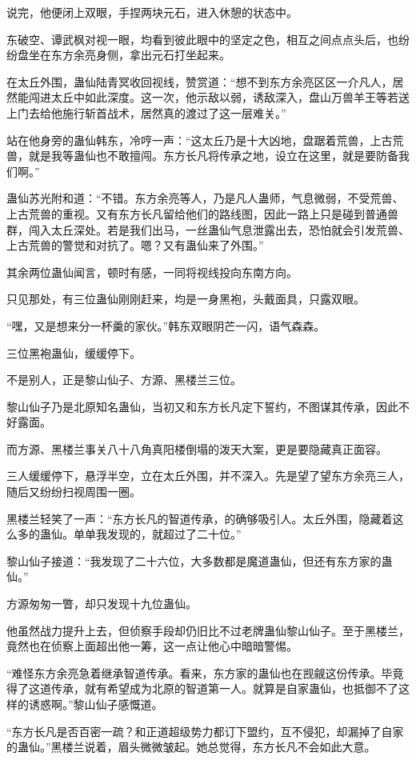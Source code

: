 \begin{this_body}
说完，他便闭上双眼，手捏两块元石，进入休憩的状态中。

东破空、谭武枫对视一眼，均看到彼此眼中的坚定之色，相互之间点点头后，也纷纷盘坐在东方余亮身侧，拿出元石打坐起来。

在太丘外围，蛊仙陆青冥收回视线，赞赏道：“想不到东方余亮区区一介凡人，居然能闯进太丘中如此深度。这一次，他示敌以弱，诱敌深入，盘山万兽羊王等若送上门去给他施行斩首战术，居然真的渡过了这一层难关。”

站在他身旁的蛊仙韩东，冷哼一声：“这太丘乃是十大凶地，盘踞着荒兽，上古荒兽，就是我等蛊仙也不敢擅闯。东方长凡将传承之地，设立在这里，就是要防备我们啊。”

蛊仙苏光附和道：“不错。东方余亮等人，乃是凡人蛊师，气息微弱，不受荒兽、上古荒兽的重视。又有东方长凡留给他们的路线图，因此一路上只是碰到普通兽群，闯入太丘深处。若是我们出马，一丝蛊仙气息泄露出去，恐怕就会引发荒兽、上古荒兽的警觉和对抗了。嗯？又有蛊仙来了外围。”

其余两位蛊仙闻言，顿时有感，一同将视线投向东南方向。

只见那处，有三位蛊仙刚刚赶来，均是一身黑袍，头戴面具，只露双眼。

“嘿，又是想来分一杯羹的家伙。”韩东双眼阴芒一闪，语气森森。

三位黑袍蛊仙，缓缓停下。

不是别人，正是黎山仙子、方源、黑楼兰三位。

黎山仙子乃是北原知名蛊仙，当初又和东方长凡定下誓约，不图谋其传承，因此不好露面。

而方源、黑楼兰事关八十八角真阳楼倒塌的泼天大案，更是要隐藏真正面容。

三人缓缓停下，悬浮半空，立在太丘外围，并不深入。先是望了望东方余亮三人，随后又纷纷扫视周围一圈。

黑楼兰轻笑了一声：“东方长凡的智道传承，的确够吸引人。太丘外围，隐藏着这么多的蛊仙。单单我发现的，就超过了二十位。”

黎山仙子接道：“我发现了二十六位，大多数都是魔道蛊仙，但还有东方家的蛊仙。”

方源匆匆一瞥，却只发现十九位蛊仙。

他虽然战力提升上去，但侦察手段却仍旧比不过老牌蛊仙黎山仙子。至于黑楼兰，竟然也在侦察上面超出他一筹，这一点让他心中暗暗警惕。

“难怪东方余亮急着继承智道传承。看来，东方家的蛊仙也在觊觎这份传承。毕竟得了这道传承，就有希望成为北原的智道第一人。就算是自家蛊仙，也抵御不了这样的诱惑啊。”黎山仙子感慨道。

“东方长凡是否百密一疏？和正道超级势力都订下盟约，互不侵犯，却漏掉了自家的蛊仙。”黑楼兰说着，眉头微微皱起。她总觉得，东方长凡不会如此大意。


\end{this_body}
